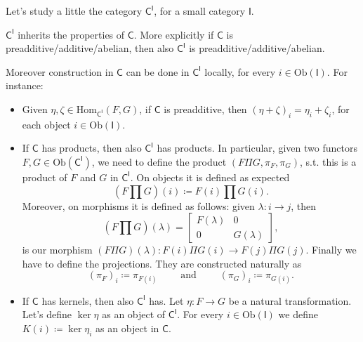 Let's study a little the category $\mathsf{C}^{\mathsf{I}}$, for a small category $\mathsf{I}$.
\begin{prop}
	$\mathsf{C}^{\mathsf{I}}$ inherits the properties of $\mathsf{C}$.
	More explicitly if $\mathsf{C}$ is preadditive/additive/abelian, then also
	$\mathsf{C}^{\mathsf{I}}$ is preadditive/additive/abelian.
	
	Moreover construction in $\mathsf{C}$ can be done in $\mathsf{C}^{\mathsf{I}}$ locally, for every $i \in \mathrm{Ob} \left(\mathsf{I}\right)$.
	For instance:
	\begin{itemize}
		\item Given $\eta, \zeta \in \mathrm{Hom}_{\mathsf{C}^{\mathsf{I}}} \left( F, G \right)$, if $\mathsf{C}$ is preadditive, then
			$\left( \eta + \zeta \right)_i = \eta_i + \zeta_i$, for each object $i \in \mathrm{Ob} \left(\mathsf{I}\right)$.
		\item If $\mathsf{C}$ has products, then also $\mathsf{C}^{\mathsf{I}}$ has products.
			In particular, given two functors $F,G \in \mathrm{Ob} \left(\mathsf{C}^{\mathsf{I}}\right)$, we need to define the product
			$\left(F \Pi G, \pi_F, \pi_G\right)$, s.t. this is a product of $F$ and $G$ in $\mathsf{C}^{\mathsf{I}}$.
			On objects it is defined as expected
			\begin{equation}
				(F \prod G)(i) \coloneqq F(i) \prod G(i)
			.\end{equation} 
			Moreover, on morphisms it is defined as follows: given $\lambda\colon i \to j$, then
			\begin{equation}
				\left( F \prod G \right)(\lambda) = 
				\begin{bmatrix}
					F(\lambda) & 0\\
					0 & G(\lambda)
				\end{bmatrix} 
			,\end{equation} 
			is our morphism $\left( F \Pi G \right)(\lambda)\colon F(i) \Pi G(i) \to F(j) \Pi G(j)$.
			Finally we have to define the projections.
			They are constructed naturally as
			\begin{equation}
				(\pi_F)_i \coloneqq \pi_{F(i)} \qquad \text{ and } \qquad \left( \pi_G \right)_i \coloneqq \pi_{G(i)}
			.\end{equation} 
		\item If $\mathsf{C}$ has kernels, then also $\mathsf{C}^{\mathsf{I}}$ has.
			Let $\eta\colon F \to G$ be a natural transformation.
			Let's define $\ker \eta$ as an object of $\mathsf{C}^{\mathsf{I}}$.
			For every $i \in \mathrm{Ob} \left(\mathsf{I}\right)$ we define $K(i) \coloneqq \ker \eta_i$ as an object in $\mathsf{C}$.

\end{itemize}
\end{prop}
